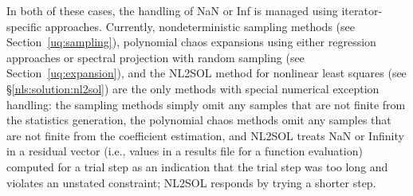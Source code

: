 In both of these cases, the handling of NaN or Inf is managed using
iterator-specific approaches.  Currently, nondeterministic sampling
methods (see Section~\ref{uq:sampling}), polynomial chaos expansions
using either regression approaches or spectral projection with random
sampling (see Section~\ref{uq:expansion}), and the NL2SOL method for
nonlinear least squares (see \S\ref{nls:solution:nl2sol}) are the only
methods with special numerical exception handling: the sampling
methods simply omit any samples that are not finite from the
statistics generation, the polynomial chaos methods omit any samples
that are not finite from the coefficient estimation, and NL2SOL treats
NaN or Infinity in a residual vector (i.e., values in a results file
for a function evaluation) computed for a trial step as an indication
that the trial step was too long and violates an unstated constraint;
NL2SOL responds by trying a shorter step.
